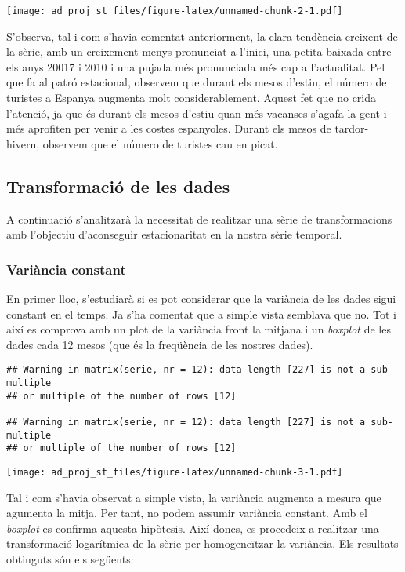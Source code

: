\documentclass[]{article}
\begin{document}
\texttt{[image: ad\_proj\_st\_files/figure-latex/unnamed-chunk-2-1.pdf]}

S'observa, tal i com s'havia comentat anteriorment, la clara tendència
creixent de la sèrie, amb un creixement menys pronunciat a l'inici, una
petita baixada entre els anys 20017 i 2010 i una pujada més pronunciada
més cap a l'actualitat. Pel que fa al patró estacional, observem que
durant els mesos d'estiu, el número de turistes a Espanya augmenta molt
considerablement. Aquest fet que no crida l'atenció, ja que és durant
els mesos d'estiu quan més vacanses s'agafa la gent i més aprofiten per
venir a les costes espanyoles. Durant els mesos de tardor-hivern,
observem que el número de turistes cau en picat.

\subsection{Transformació de les
dades}\label{transformacio-de-les-dades}

A continuació s'analitzarà la necessitat de realitzar una sèrie de
transformacions amb l'objectiu d'aconseguir estacionaritat en la nostra
sèrie temporal.

\subsubsection{Variància constant}\label{variancia-constant}

En primer lloc, s'estudiarà si es pot considerar que la variància de les
dades sigui constant en el temps. Ja s'ha comentat que a simple vista
semblava que no. Tot i així es comprova amb un plot de la variància
front la mitjana i un \emph{boxplot} de les dades cada 12 mesos (que és
la freqüència de les nostres dades).

\begin{verbatim}
## Warning in matrix(serie, nr = 12): data length [227] is not a sub-multiple
## or multiple of the number of rows [12]

## Warning in matrix(serie, nr = 12): data length [227] is not a sub-multiple
## or multiple of the number of rows [12]
\end{verbatim}

\texttt{[image: ad\_proj\_st\_files/figure-latex/unnamed-chunk-3-1.pdf]}

Tal i com s'havia observat a simple vista, la variància augmenta a
mesura que agumenta la mitja. Per tant, no podem assumir variància
constant. Amb el \emph{boxplot} es confirma aquesta hipòtesis. Així
doncs, es procedeix a realitzar una transformació logarítmica de la
sèrie per homogeneïtzar la variància. Els resultats obtinguts són els
següents:
\end{document}
